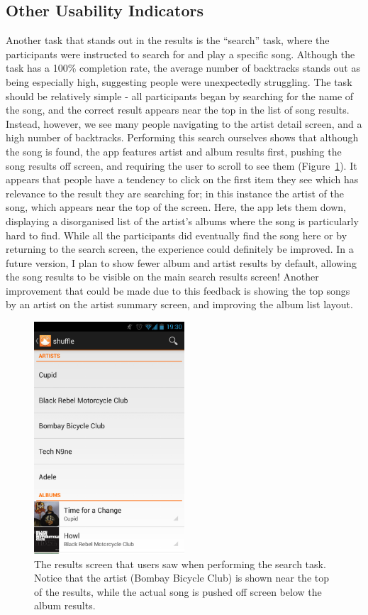 \subsection{Other Usability Indicators}

Another task that stands out in the results is the ``search'' task, where the participants
were instructed to search for and play a specific song. Although the task has a 100\% completion
rate, the average number of backtracks stands out as being especially high, suggesting people
were unexpectedly struggling. The task should be relatively simple - all participants
began by searching for the name of the song, and the correct result appears near the top
in the list of song results. Instead, however, we see many people navigating to the artist
detail screen, and a high number of backtracks. Performing this search ourselves shows that
although the song is found, the app features artist and album results first, pushing the
song results off screen, and requiring the user to scroll to see them (Figure~\ref{fig:search-results}). It appears that people
have a tendency to click on the first item they see which has relevance to the result they
are searching for; in this instance the artist of the song, which appears near the top
of the screen. Here, the app lets them down, displaying a disorganised list of the artist's
albums where the song is particularly hard to find. While all the participants did eventually
find the song here or by returning to the search screen, the experience could definitely be
improved. In a future version, I plan to show fewer album and artist results by default,
allowing the song results to be visible on the main search results screen! Another improvement
that could be made due to this feedback is showing the top songs by an artist on the artist
summary screen, and improving the album list layout.

\begin{figure}[h]
  \centering 
  \includegraphics[width=0.5\textwidth]{images/search-results}
  \caption{The results screen that users saw when performing the search task.
           Notice that the artist (Bombay Bicycle Club) is shown near the top of the
           results, while the actual song is pushed off screen below the album
           results.}
  \label{fig:search-results}
\end{figure}

